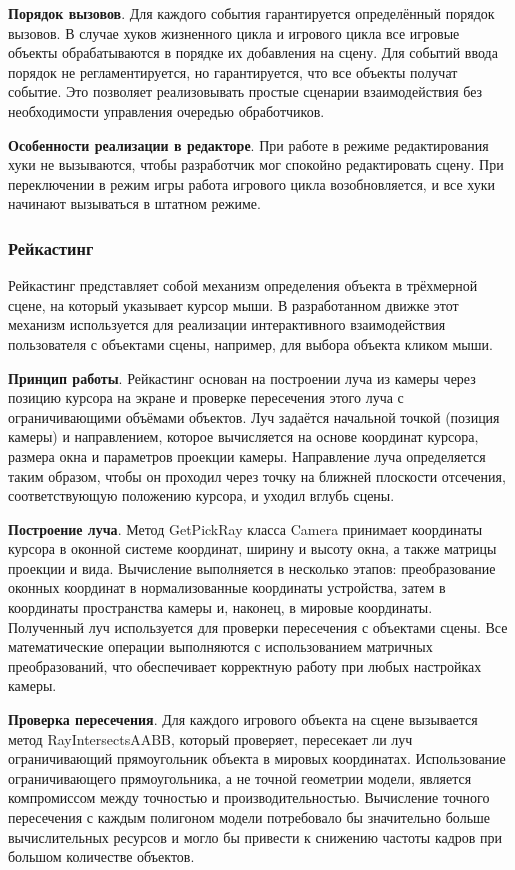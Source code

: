 \textbf{Порядок вызовов}. Для каждого события гарантируется определённый порядок вызовов. В случае хуков жизненного цикла и игрового цикла все игровые объекты обрабатываются в порядке их добавления на сцену. Для событий ввода порядок не регламентируется, но гарантируется, что все объекты получат событие. Это позволяет реализовывать простые сценарии взаимодействия без необходимости управления очередью обработчиков.

\textbf{Особенности реализации в редакторе}. При работе в режиме редактирования хуки не вызываются, чтобы разработчик мог спокойно редактировать сцену. При переключении в режим игры работа игрового цикла возобновляется, и все хуки начинают вызываться в штатном режиме.

\subsubsection{Рейкастинг}
Рейкастинг представляет собой механизм определения объекта в трёхмерной сцене, на который указывает курсор мыши. В разработанном движке этот механизм используется для реализации интерактивного взаимодействия пользователя с объектами сцены, например, для выбора объекта кликом мыши.

\textbf{Принцип работы}. Рейкастинг основан на построении луча из камеры через позицию курсора на экране и проверке пересечения этого луча с ограничивающими объёмами объектов. Луч задаётся начальной точкой (позиция камеры) и направлением, которое вычисляется на основе координат курсора, размера окна и параметров проекции камеры. Направление луча определяется таким образом, чтобы он проходил через точку на ближней плоскости отсечения, соответствующую положению курсора, и уходил вглубь сцены.

\textbf{Построение луча}. Метод GetPickRay класса Camera принимает координаты курсора в оконной системе координат, ширину и высоту окна, а также матрицы проекции и вида. Вычисление выполняется в несколько этапов: преобразование оконных координат в нормализованные координаты устройства, затем в координаты пространства камеры и, наконец, в мировые координаты. Полученный луч используется для проверки пересечения с объектами сцены. Все математические операции выполняются с использованием матричных преобразований, что обеспечивает корректную работу при любых настройках камеры.

\textbf{Проверка пересечения}. Для каждого игрового объекта на сцене вызывается метод RayIntersectsAABB, который проверяет, пересекает ли луч ограничивающий прямоугольник объекта в мировых координатах. Использование ограничивающего прямоугольника, а не точной геометрии модели, является компромиссом между точностью и производительностью. Вычисление точного пересечения с каждым полигоном модели потребовало бы значительно больше вычислительных ресурсов и могло бы привести к снижению частоты кадров при большом количестве объектов.


